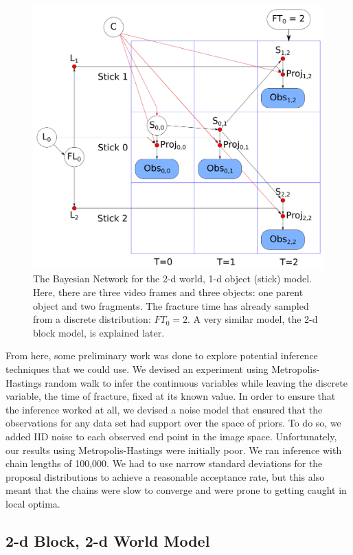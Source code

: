 \documentclass[runningheads]{llncs}
\begin{document}
\begin{figure}[t]
\begin{center}
   \includegraphics[width=0.8\linewidth]{figs/2d-stick-net-20190930.png}
\end{center}
   \caption{The Bayesian Network for the 2-d world, 1-d object (stick) model. Here, 
        there are three video frames and three objects: one parent object and 
        two fragments. The fracture time has already sampled from 
        a discrete distribution: $FT_0 = 2$. A very similar model, the 
        2-d block model, is explained later.}
\label{fig:long}
\label{fig:onecol}
\end{figure}

From here, some preliminary work was done to explore potential 
inference techniques that we could use. We devised an experiment using 
Metropolis-Hastings random walk to infer the continuous variables while leaving the discrete 
variable, the time of fracture, fixed at its known value. In order to ensure 
that the inference worked at all, we devised a noise model that ensured that 
the observations for any data set had support over the space of priors. To do 
so, we added IID noise to each observed end point in the image space. 
Unfortunately, our results using Metropolis-Hastings were initially poor. We ran inference with 
chain lengths of 100,000. We had to use narrow standard deviations for the 
proposal distributions to achieve a reasonable acceptance rate, but this also 
meant that the chains were slow to converge and were prone to getting caught 
in local optima.

\subsection{2-d Block, 2-d World Model}
\end{document}
